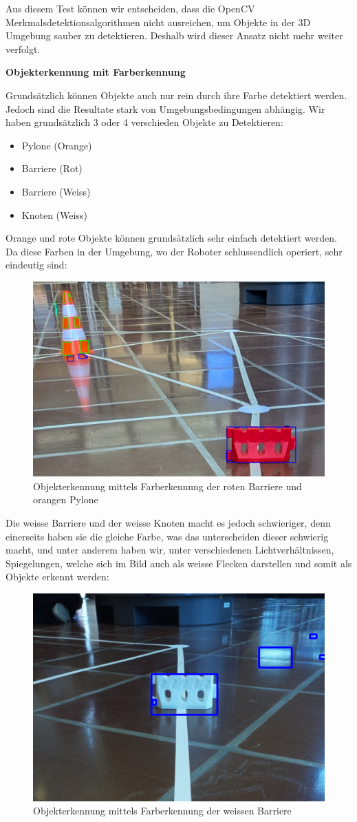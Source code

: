 Aus diesem Test können wir entscheiden, dass die OpenCV Merkmalsdetektionsalgorithmen nicht ausreichen, um Objekte in der 3D Umgebung sauber zu detektieren. Deshalb wird dieser Ansatz nicht mehr weiter verfolgt.

\textbf{Objekterkennung mit Farberkennung}

Grundsätzlich können Objekte auch nur rein durch ihre Farbe detektiert werden. Jedoch sind die Resultate stark von Umgebungsbedingungen abhängig.
Wir haben grundsätzlich 3 oder 4 verschieden Objekte zu Detektieren:
\begin{itemize}
    \item Pylone (Orange)
    \item Barriere (Rot)
    \item Barriere (Weiss)
    \item Knoten (Weiss)
\end{itemize}

Orange und rote Objekte können grundsätzlich sehr einfach detektiert werden. Da diese Farben in der Umgebung, wo der Roboter schlussendlich operiert, sehr eindeutig sind:

\begin{figure}[H]
    \centering
    \includegraphics[width=0.5\linewidth]{assets/informatik-prototyp/opencv/object_detection_with_hsv/hsv_object_detection.png}
    \caption{Objekterkennung mittels Farberkennung der roten Barriere und orangen Pylone}
    \label{fig:opencv_hsv_object_detection_good}
\end{figure}


Die weisse Barriere und der weisse Knoten macht es jedoch schwieriger, denn einerseits haben sie die gleiche Farbe, was das unterscheiden dieser schwierig macht, und unter anderem haben wir, unter verschiedenen Lichtverhältnissen, Spiegelungen, welche sich im Bild auch als weisse Flecken darstellen und somit als Objekte erkennt werden:

\begin{figure}[H]
    \centering
    \includegraphics[width=0.5\linewidth]{assets/informatik-prototyp/opencv/object_detection_with_hsv/hsv_object_detection_white.png}
    \caption{Objekterkennung mittels Farberkennung der weissen Barriere}
    \label{fig:opencv_hsv_object_detection_bad}
\end{figure}

